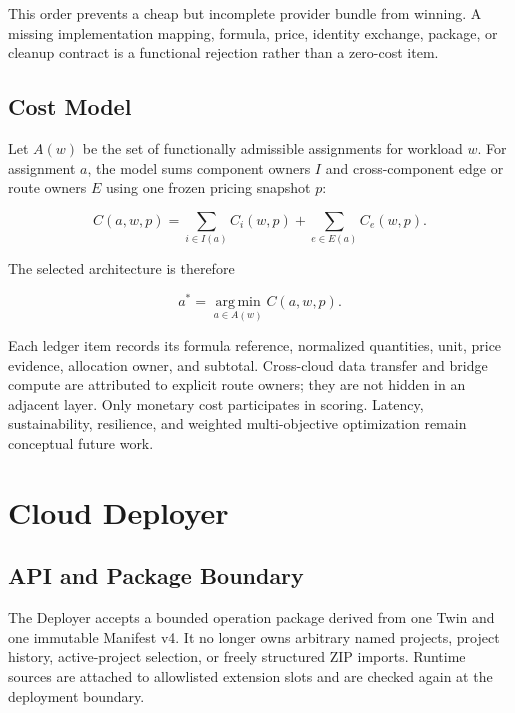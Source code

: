 This order prevents a cheap but incomplete provider bundle from winning. A
missing implementation mapping, formula, price, identity exchange, package,
or cleanup contract is a functional rejection rather than a zero-cost item.

\subsection{Cost Model}
\label{sec:cost-formulas}

Let $A(w)$ be the set of functionally admissible assignments for workload
$w$. For assignment $a$, the model sums component owners $I$ and cross-component
edge or route owners $E$ using one frozen pricing snapshot $p$:

\begin{equation}
    C(a,w,p) = \sum_{i \in I(a)} C_i(w,p)
             + \sum_{e \in E(a)} C_e(w,p).
\end{equation}

The selected architecture is therefore

\begin{equation}
    a^* = \operatorname*{arg\,min}_{a \in A(w)} C(a,w,p).
\end{equation}

Each ledger item records its formula reference, normalized quantities, unit,
price evidence, allocation owner, and subtotal. Cross-cloud data transfer and
bridge compute are attributed to explicit route owners; they are not hidden in
an adjacent layer. Only monetary cost participates in scoring. Latency,
sustainability, resilience, and weighted multi-objective optimization remain
conceptual future work.

\section{Cloud Deployer}
\label{sec:deployer}

\subsection{API and Package Boundary}
\label{sec:deployer-api}

The Deployer accepts a bounded operation package derived from one Twin and one
immutable Manifest v4. It no longer owns arbitrary named projects, project
history, active-project selection, or freely structured ZIP imports. Runtime
sources are attached to allowlisted extension slots and are checked again at
the deployment boundary.

